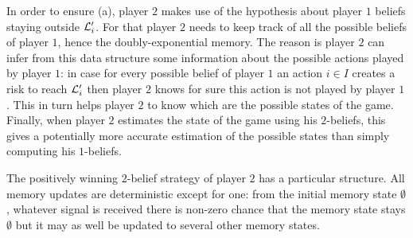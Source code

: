 {In order to ensure (a), player $2$ makes use of the hypothesis
about player $1$ beliefs staying outside $\mathcal{L}_i'$. For that player $2$ needs to keep track of all the possible beliefs of player $1$, hence the doubly-exponential memory.
The reason is player $2$ can infer
from this data structure some information about the possible actions played by player $1$: in case
for every possible belief of player $1$ an action $i\in I$ creates a risk to reach $\mathcal{L}'_i$
then player $2$ knows for sure this action is not played by player $1$.
This in turn helps player $2$ to know which are the possible states of the game.
Finally, when player $2$ estimates the state of the game using his $2$-beliefs,
this gives a potentially more accurate estimation of the possible states than simply computing his $1$-beliefs.}

{The positively winning $2$-belief strategy of player $2$ has a particular structure.
All memory updates are deterministic except for one: from
the initial memory state $\emptyset$,
whatever signal is received there is non-zero chance that the memory state stays $\emptyset$ but it may as well 
be updated to several other memory states.}
\smallskip

%


